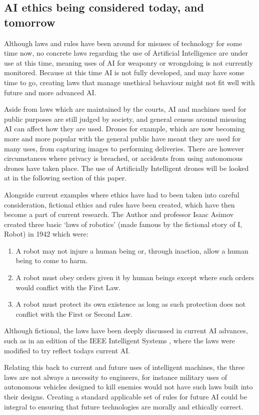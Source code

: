 \documentclass[article]{IEEEtran}
\begin{document}
\subsection{AI ethics being considered today, and tomorrow}
Although laws and rules have been around for misuses of technology for some time now, no concrete laws regarding the use of Artificial Intelligence are under use at this time, meaning uses of AI for weaponry or wrongdoing is not currently monitored. Because at this time AI is not fully developed, and may have some time to go, creating laws that manage unethical behaviour might not fit well with future and more advanced AI. \par
Aside from laws which are maintained by the courts, AI and machines used for public purposes are still judged by society, and general census around misusing AI can affect how they are used. Drones for example, which are now becoming more and more popular with the general public have meant they are used for many uses, from capturing images to performing deliveries. There are however circumstances where privacy is breached, or accidents from using autonomous drones have taken place. The use of Artificially Intelligent drones will be looked at in the following section of this paper.\par
Alongside current examples where ethics have had to been taken into careful consideration, fictional ethics and rules have been created, which have then become a part of current research. The Author and professor Isaac Asimov created three basic ‘laws of robotics’ (made famous by the fictional story of I, Robot) in \cite{laws} 1942 which were:
\begin{enumerate}
\item A robot may not injure a human being or, through inaction, allow a human being to come to harm.
\item A robot must obey orders given it by human beings except where such orders would conflict with the First Law.
\item A robot must protect its own existence as long as such protection does not conflict with the First or Second Law. 
\end{enumerate}
Although fictional, the laws have been deeply discussed in current AI advances, such as in an edition of the IEEE Intelligent Systems \cite{ieeRobots}, where the laws were modified to try reflect todays current AI.\par
 Relating this back to current and future uses of intelligent machines, the three laws are not always a necessity to engineers, for instance military uses of autonomous vehicles designed to kill enemies would not have such laws built into their designs. 
Creating a standard applicable set of rules for future AI could be integral to ensuring that future technologies are morally and ethically correct.
\end{document}
